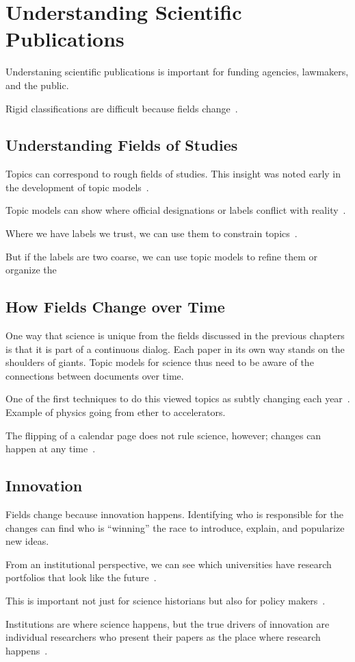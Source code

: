 

\chapter{Understanding Scientific Publications}
\label{ch:sci}

Understaning scientific publications is important for funding
agencies, lawmakers, and the public.

Rigid classifications are difficult because fields
change~\citep{szostak-04}.

\section{Understanding Fields of Studies}

Topics can correspond to rough fields of studies.  This insight was
noted early in the development of topic models~\citep{griffiths-04}.

Topic models can show where official designations or labels conflict
with reality~\citep{talley-11}.

Where we have labels we trust, we can use them to constrain
topics~\citep{ramage-09}.

But if the labels are two coarse, we can use topic models to refine
them or organize the\citep{Nguyen:Boyd-Graber:Resnik:Chang-2014}

\section{How Fields Change over Time}
\label{sec:science_fields}

One way that science is unique from the fields discussed in the
previous chapters is that it is part of a continuous dialog.  Each
paper in its own way stands on the shoulders of giants. Topic models
for science thus need to be aware of the connections between documents
over time.

One of the first techniques to do this viewed topics as subtly
changing each year~\citep{blei-06b}.  Example of physics going from
ether to accelerators.

The flipping of a calendar page does not rule science, however;
changes can happen at any time~\citep{wang-06,wang-08}.

\section{Innovation}

Fields change because innovation happens.  Identifying who is
responsible for the changes can find who is ``winning'' the race to
introduce, explain, and popularize new ideas.

From an institutional perspective, we can see which universities have
research portfolios that look like the future~\citep{ramage-10}.

This is important not just for science historians but also for policy
makers~\citep{largent-12}.

Institutions are where science happens, but the true drivers of
innovation are individual researchers who present their papers as the
place where research happens~\citep{gerrish-10}.
